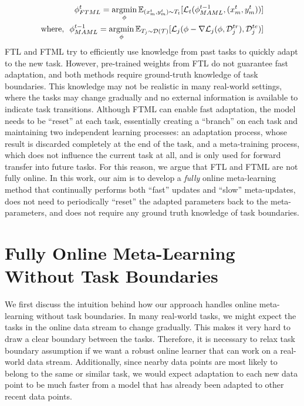 {\small
\begin{align*}
\phi^t_{FTML} = \operatorname*{argmin}_{\phi} \mathbb{E}_{(x^t_m, y^t_m) \sim T_t }[\mathcal{L}_{t}(\phi^{t-1}_{MAML}, (x^t_m, y^t_m))] \\
\text{where,} \ \ \phi^{t-1}_{MAML} = \operatorname*{argmin}_{\phi} \mathbb{E}_{T_j \sim \mathcal{D}(\mathcal{T})}[\mathcal{L}_{j}(\phi - \nabla\mathcal{L}_{j}(\phi, \mathcal{D}^{tr}_j), \mathcal{D}^{te}_j)]
\end{align*}}
FTL and FTML try to efficiently use knowledge from past tasks to quickly adapt to the new task. However, pre-trained weights from FTL do not guarantee fast adaptation, and both methods require ground-truth knowledge of task boundaries. This knowledge may not be realistic in many real-world settings, where the tasks may change gradually and no external information is available to indicate task transitions. Although FTML can enable fast adaptation, the model needs to be ``reset'' at each task, essentially creating a ``branch'' on each task and maintaining two independent learning processes: an adaptation process, whose result is discarded completely at the end of the task, and a meta-training process, which does not influence the current task at all, and is only used for forward transfer into future tasks. For this reason, we argue that FTL and FTML are not fully online. In this work, our aim is to develop a \emph{fully} online meta-learning method that continually performs both ``fast'' updates and ``slow'' meta-updates, does not need to periodically ``reset'' the adapted parameters back to the meta-parameters, and does not require any ground truth knowledge of task boundaries.

\section{Fully Online Meta-Learning Without Task Boundaries}


We first discuss the intuition behind how our approach handles online meta-learning without task boundaries. In many real-world tasks, we might expect the tasks in the online data stream to change gradually. This makes it very hard to draw a clear boundary between the tasks. Therefore, it is necessary to relax task boundary assumption if we want a robust online learner that can work on a real-world data stream. Additionally, since nearby data points are most likely to belong to the same or similar task, we would expect adaptation to each new data point to be much faster from a model that has already been adapted to other recent data points.

